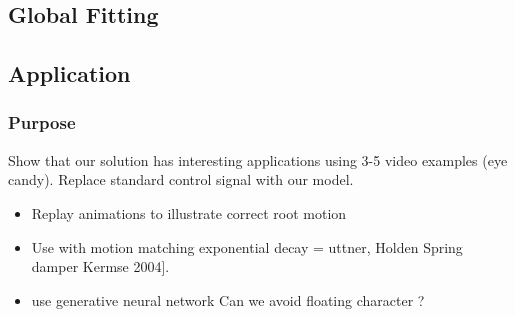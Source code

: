 \subsection{Global Fitting}

\subsection{Application}
\subsubsection{Purpose} Show that our solution has interesting applications using 3-5 video examples (eye candy).
Replace standard control signal with our model.
\begin{itemize}
    \item{Replay animations to illustrate correct root motion}
    \item{Use with motion matching} exponential decay = uttner, Holden Spring damper Kermse 2004].
    \item{use generative neural network} Can we avoid floating character ?
\end{itemize}

